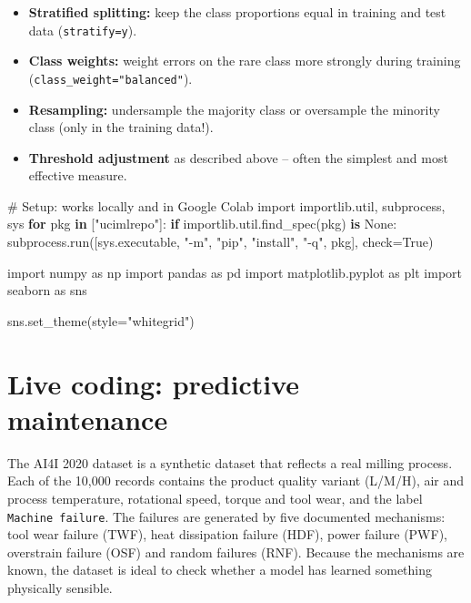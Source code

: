 \documentclass[
  letterpaper,
  DIV=11,
  numbers=noendperiod]{scrreprt}
\newenvironment{Shaded}{\begin{snugshade}}{\end{snugshade}}
\newcommand{\CommentTok}[1]{\textcolor[rgb]{0.37,0.37,0.37}{#1}}
\newcommand{\ControlFlowTok}[1]{\textcolor[rgb]{0.00,0.23,0.31}{\textbf{#1}}}
\newcommand{\ImportTok}[1]{\textcolor[rgb]{0.00,0.46,0.62}{#1}}
\newcommand{\KeywordTok}[1]{\textcolor[rgb]{0.00,0.23,0.31}{\textbf{#1}}}
\newcommand{\NormalTok}[1]{\textcolor[rgb]{0.00,0.23,0.31}{#1}}
\newcommand{\OperatorTok}[1]{\textcolor[rgb]{0.37,0.37,0.37}{#1}}
\newcommand{\StringTok}[1]{\textcolor[rgb]{0.13,0.47,0.30}{#1}}
\newcommand{\VariableTok}[1]{\textcolor[rgb]{0.07,0.07,0.07}{#1}}
\providecommand{\tightlist}{%
  \setlength{\itemsep}{0pt}\setlength{\parskip}{0pt}}\usepackage{longtable,booktabs,array}
\begin{document}
\begin{itemize}
\tightlist
\item
  \textbf{Stratified splitting:} keep the class proportions equal in
  training and test data (\texttt{stratify=y}).
\item
  \textbf{Class weights:} weight errors on the rare class more strongly
  during training (\texttt{class\_weight="balanced"}).
\item
  \textbf{Resampling:} undersample the majority class or oversample the
  minority class (only in the training data!).
\item
  \textbf{Threshold adjustment} as described above -- often the simplest
  and most effective measure.
\end{itemize}

\begin{Shaded}
\begin{Highlighting}[]
\CommentTok{\# Setup: works locally and in Google Colab}
\ImportTok{import}\NormalTok{ importlib.util, subprocess, sys}
\ControlFlowTok{for}\NormalTok{ pkg }\KeywordTok{in}\NormalTok{ [}\StringTok{"ucimlrepo"}\NormalTok{]:}
    \ControlFlowTok{if}\NormalTok{ importlib.util.find\_spec(pkg) }\KeywordTok{is} \VariableTok{None}\NormalTok{:}
\NormalTok{        subprocess.run([sys.executable, }\StringTok{"{-}m"}\NormalTok{, }\StringTok{"pip"}\NormalTok{, }\StringTok{"install"}\NormalTok{, }\StringTok{"{-}q"}\NormalTok{, pkg], check}\OperatorTok{=}\VariableTok{True}\NormalTok{)}

\ImportTok{import}\NormalTok{ numpy }\ImportTok{as}\NormalTok{ np}
\ImportTok{import}\NormalTok{ pandas }\ImportTok{as}\NormalTok{ pd}
\ImportTok{import}\NormalTok{ matplotlib.pyplot }\ImportTok{as}\NormalTok{ plt}
\ImportTok{import}\NormalTok{ seaborn }\ImportTok{as}\NormalTok{ sns}

\NormalTok{sns.set\_theme(style}\OperatorTok{=}\StringTok{"whitegrid"}\NormalTok{)}
\end{Highlighting}
\end{Shaded}

\section{Live coding: predictive
maintenance}\label{live-coding-predictive-maintenance}

The AI4I 2020 dataset is a synthetic dataset that reflects a real
milling process. Each of the 10,000 records contains the product quality
variant (L/M/H), air and process temperature, rotational speed, torque
and tool wear, and the label \texttt{Machine\ failure}. The failures are
generated by five documented mechanisms: tool wear failure (TWF), heat
dissipation failure (HDF), power failure (PWF), overstrain failure (OSF)
and random failures (RNF). Because the mechanisms are known, the dataset
is ideal to check whether a model has learned something physically
sensible.
\end{document}
